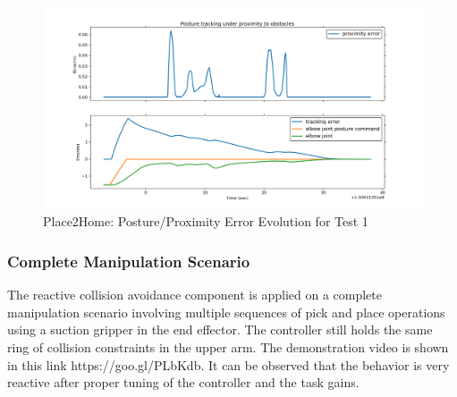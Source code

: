 \begin{figure}[H]
\centering
\includegraphics[width=15cm,height=6cm,center]{chapters/doa/images/delft/test_place2home/test2.png}
\caption{Place2Home: Posture/Proximity Error Evolution for Test 1}
\label{Place2Home:test2}
\end{figure}
   

\subsubsection{Complete Manipulation Scenario}
The reactive collision avoidance component is applied on a complete manipulation scenario involving multiple sequences of pick and place operations using a suction gripper in the end effector. The controller still holds the same ring of collision constraints in the upper arm. The demonstration video is shown in this link https://goo.gl/PLbKdb. It can be observed that the behavior is very reactive after proper tuning of the controller and the task gains.    
